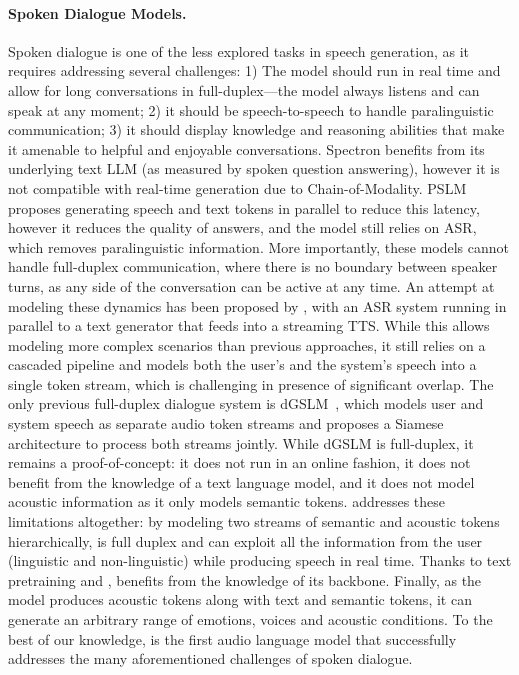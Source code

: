 \paragraph{Spoken Dialogue Models.}
Spoken dialogue is one of the less explored tasks in speech generation, as it requires addressing several challenges: 1) The model should run in real time and allow for long conversations in full-duplex---the model always listens and can speak at any moment; 2) it should be speech-to-speech to handle paralinguistic communication; 3) it should display knowledge and reasoning abilities that make it amenable to helpful and enjoyable conversations. Spectron benefits from its underlying text LLM (as measured by spoken question answering), however it is not compatible with real-time generation due to Chain-of-Modality. PSLM proposes generating speech and text tokens in parallel to reduce this latency, however it reduces the quality of answers, and the model still relies on ASR, which removes paralinguistic information. More importantly, these models cannot handle full-duplex communication, where there is no boundary between speaker turns, as any side of the conversation can be active at any time. An attempt at modeling these dynamics has been proposed by \citet{fullduplexfsm}, with an ASR system running in parallel to a text generator that feeds into a streaming TTS. While this allows modeling more complex scenarios than previous approaches, it still relies on a cascaded pipeline and models both the user's and the system's speech into a single token stream, which is challenging in presence of significant overlap. The only previous full-duplex dialogue system is dGSLM~\citep{nguyen-etal-2023-generative}, which models user and system speech as separate audio token streams and proposes a Siamese architecture to process both streams jointly. While dGSLM is full-duplex, it remains a proof-of-concept: it does not run in an online fashion, it does not benefit from the knowledge of a text language model, and it does not model acoustic information as it only models semantic tokens. \ours{} addresses these limitations altogether: by modeling two streams of semantic and acoustic tokens hierarchically, \ours{} is full duplex and can exploit all the information from the user (linguistic and non-linguistic) while producing speech in real time. Thanks to text pretraining and \interleaving, \ours{} benefits from the knowledge of its \helium backbone. Finally, as the model produces acoustic tokens along with text and semantic tokens, it can generate an arbitrary range of emotions, voices and acoustic conditions. To the best of our knowledge, \ours{} is the first audio language model that successfully addresses the many aforementioned challenges of spoken dialogue.
